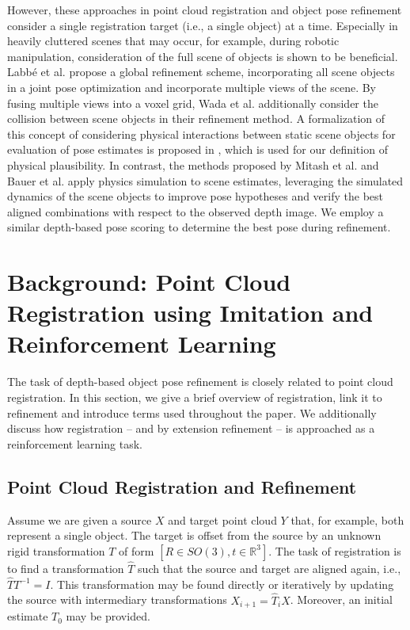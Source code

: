 \documentclass[10pt,twocolumn,letterpaper]{article}
\begin{document}
However, these approaches in point cloud registration and object pose refinement consider a single registration target (i.e., a single object) at a time. Especially in heavily cluttered scenes that may occur, for example, during robotic manipulation, consideration of the full scene of objects is shown to be beneficial. Labb{\'e} et al. \cite{labbe2020cosypose} propose a global refinement scheme, incorporating all scene objects in a joint pose optimization and incorporate multiple views of the scene. By fusing multiple views into a voxel grid, Wada et al. \cite{wada2020morefusion} additionally consider the collision between scene objects in their refinement method. A formalization of this concept of considering physical interactions between static scene objects for evaluation of pose estimates is proposed in \cite{bauer2020eccvw}, which is used for our definition of physical plausibility. In contrast, the methods proposed by Mitash et al. \cite{mitash2018mcts} and Bauer et al. \cite{bauer2020verefine} apply physics simulation to scene estimates, leveraging the simulated dynamics of the scene objects to improve pose hypotheses and verify the best aligned combinations with respect to the observed depth image. We employ a similar depth-based pose scoring to determine the best pose during refinement.

\section{Background: Point Cloud Registration using Imitation and Reinforcement Learning}\label{sec:background}
The task of depth-based object pose refinement is closely related to point cloud registration. In this section, we give a brief overview of registration, link it to refinement and introduce terms used throughout the paper. We additionally discuss how registration -- and by extension refinement -- is approached as a reinforcement learning task.

\subsection{Point Cloud Registration and Refinement} Assume we are given a source $X$ and target point cloud $Y$ that, for example, both represent a single object. The target is offset from the source by an unknown rigid transformation $T$ of form $[R \in SO(3), t \in \mathbb{R}^3]$. The task of registration is to find a transformation $\hat{T}$ such that the source and target are aligned again, i.e., $\hat{T} T^{-1} = I$. This transformation may be found directly or iteratively by updating the source with intermediary transformations $X_{i+1}=\hat{T}_i X$. Moreover, an initial estimate $\hat{T_0}$ may be provided. 
\end{document}
